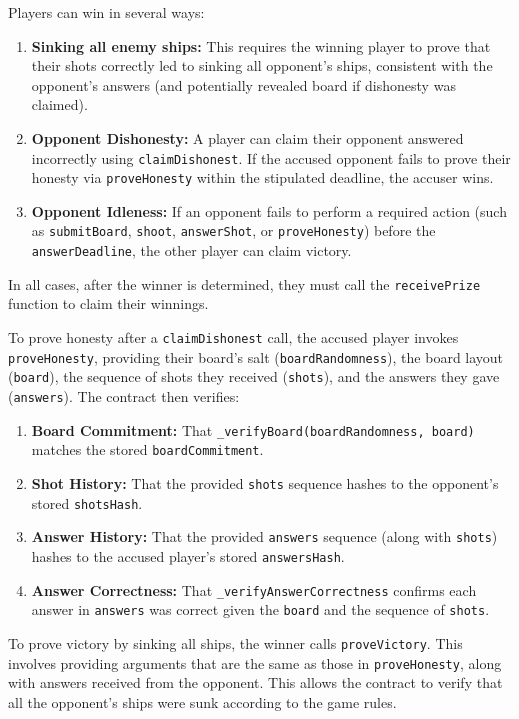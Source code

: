 \documentclass{article}
\begin{document}
    Players can win in several ways:
    \begin{enumerate}
        \item \textbf{Sinking all enemy ships:} This requires the winning player to prove that their shots correctly led to sinking all opponent's ships, consistent with the opponent's answers (and potentially revealed board if dishonesty was claimed).
        \item \textbf{Opponent Dishonesty:} A player can claim their opponent answered incorrectly using \texttt{claimDishonest}. If the accused opponent fails to prove their honesty via \texttt{proveHonesty} within the stipulated deadline, the accuser wins.
        \item \textbf{Opponent Idleness:} If an opponent fails to perform a required action (such as \texttt{submitBoard}, \texttt{shoot}, \texttt{answerShot}, or \texttt{proveHonesty}) before the \texttt{answerDeadline}, the other player can claim victory.
    \end{enumerate}
    In all cases, after the winner is determined, they must call the \texttt{receivePrize} function to claim their winnings.
    
    To prove honesty after a \texttt{claimDishonest} call, the accused player invokes \texttt{proveHonesty}, providing their board's salt (\texttt{boardRandomness}), the board layout (\texttt{board}), the sequence of shots they received (\texttt{shots}), and the answers they gave (\texttt{answers}). The contract then verifies:
    \begin{enumerate}
        \item \textbf{Board Commitment:} That \texttt{\_verifyBoard(boardRandomness, board)} matches the stored \texttt{boardCommitment}.
        \item \textbf{Shot History:} That the provided \texttt{shots} sequence hashes to the opponent's stored \texttt{shotsHash}.
        \item \textbf{Answer History:} That the provided \texttt{answers} sequence (along with \texttt{shots}) hashes to the accused player's stored \texttt{answersHash}.
        \item \textbf{Answer Correctness:} That \texttt{\_verifyAnswerCorrectness} confirms each answer in \texttt{answers} was correct given the \texttt{board} and the sequence of \texttt{shots}.
    \end{enumerate}

    To prove victory by sinking all ships, the winner calls \texttt{proveVictory}. This involves providing arguments that are the same as those in \texttt{proveHonesty}, along with answers received from the opponent. This allows the contract to verify that all the opponent's ships were sunk according to the game rules.
\end{document}
